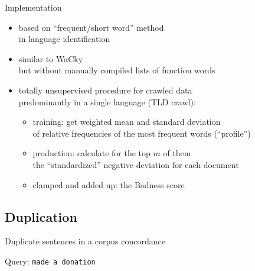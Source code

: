 \begin{frame}
  {Implementation}
  \begin{itemize}
    \item based on ``frequent\slash short word'' method\\
      in language identification \citep{Grefenstette1995}
    \item similar to WaCky \citep{Baroni-ea2009}\\
      but without manually compiled lists of function words
    \item totally unsupervised procedure for crawled data\\
      predominantly in a single language (TLD crawl):
      \begin{itemize}
	\item \alert{training}: get weighted mean and standard deviation\\
	  of relative frequencies of the most frequent words (``profile'')
	\item \alert{production}: calculate for the top $m$ of them\\
	  the ``standardized'' negative deviation for each document\\
	\item clamped and added up: the \alert{Badness score}
      \end{itemize}
  \end{itemize}
\end{frame}


\subsection{Duplication}


\begin{frame}
{Duplicate sentences in a corpus concordance}


Query: \texttt{made a donation}

\vspace{1cm}

   \begin{center}
     \\
   \end{center}  

\pause

\end{frame}



